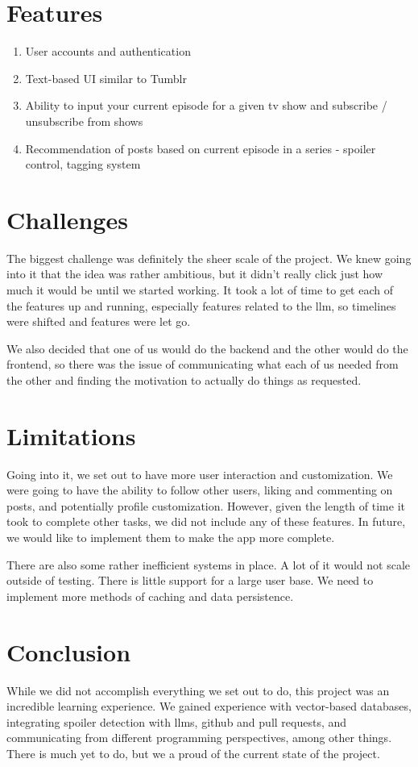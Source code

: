 \documentclass{homework}
\begin{document}
\section{Features}
\begin{enumerate}
  \item User accounts and authentication
  \item Text-based UI similar to Tumblr
  \item Ability to input your current episode for a given tv show and subscribe / unsubscribe from shows
  \item Recommendation of posts based on current episode in a series - spoiler control, tagging system
\end{enumerate}

\section{Challenges}
The biggest challenge was definitely the sheer scale of the project. We knew going into it that the idea was rather ambitious, but it didn't really click just how much it would be until we started working. It took a lot of time to get each of the features up and running, especially features related to the llm, so timelines were shifted and features were let go.

We also decided that one of us would do the backend and the other would do the frontend, so there was the issue of communicating what each of us needed from the other and finding the motivation to actually do things as requested. 

\section{Limitations}
Going into it, we set out to have more user interaction and customization. We were going to have the ability to follow other users, liking and commenting on posts, and potentially profile customization. However, given the length of time it took to complete other tasks, we did not include any of these features. In future, we would like to implement them to make the app more complete. 

There are also some rather inefficient systems in place. A lot of it would not scale outside of testing. There is little support for a large user base. We need to implement more methods of caching and data persistence. 

\section{Conclusion}
While we did not accomplish everything we set out to do, this project was an incredible learning experience. We gained experience with vector-based databases, integrating spoiler detection with llms, github and pull requests, and communicating from different programming perspectives, among other things. There is much yet to do, but we a proud of the current state of the project.
\end{document}
